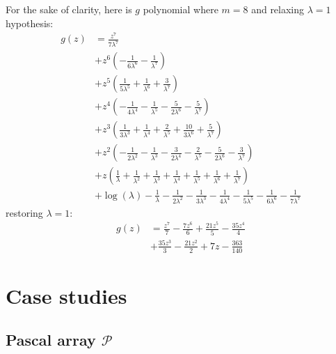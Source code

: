 For the sake of clarity, here is $g$ polynomial where $m=8$ and relaxing $\lambda=1$ hypothesis:
\begin{displaymath}
\begin{split}
g{\left (z \right )} &= \frac{z^{7}}{7 \lambda^{7}} \\
&+ z^{6} \left(- \frac{1}{6 \lambda^{6}} - \frac{1}{\lambda^{7}}\right) \\
&+ z^{5} \left(\frac{1}{5 \lambda^{5}} + \frac{1}{\lambda^{6}} + \frac{3}{\lambda^{7}}\right) \\
&+ z^{4} \left(- \frac{1}{4 \lambda^{4}} - \frac{1}{\lambda^{5}} - \frac{5}{2 \lambda^{6}} - \frac{5}{\lambda^{7}}\right) \\
&+ z^{3} \left(\frac{1}{3 \lambda^{3}} + \frac{1}{\lambda^{4}} + \frac{2}{\lambda^{5}} + \frac{10}{3 \lambda^{6}} + \frac{5}{\lambda^{7}}\right) \\
&+ z^{2} \left(- \frac{1}{2 \lambda^{2}} - \frac{1}{\lambda^{3}} - \frac{3}{2 \lambda^{4}} - \frac{2}{\lambda^{5}} - \frac{5}{2 \lambda^{6}} - \frac{3}{\lambda^{7}}\right) \\
&+ z \left(\frac{1}{\lambda} + \frac{1}{\lambda^{2}} + \frac{1}{\lambda^{3}} + \frac{1}{\lambda^{4}} + \frac{1}{\lambda^{5}} + \frac{1}{\lambda^{6}} + \frac{1}{\lambda^{7}}\right) \\
&+ \log{\left (\lambda \right )} - \frac{1}{\lambda} - \frac{1}{2 \lambda^{2}} - \frac{1}{3 \lambda^{3}} - \frac{1}{4 \lambda^{4}} - \frac{1}{5 \lambda^{5}} - \frac{1}{6 \lambda^{6}} - \frac{1}{7 \lambda^{7}}
\end{split}
\end{displaymath}
restoring $\lambda=1$:
\begin{displaymath}
\begin{split}
g{\left (z \right )} &= \frac{z^{7}}{7} - \frac{7 z^{6}}{6} + \frac{21 z^{5}}{5} - \frac{35 z^{4}}{4} \\
&+ \frac{35 z^{3}}{3} - \frac{21 z^{2}}{2} + 7 z - \frac{363}{140}
\end{split}
\end{displaymath}


\section{Case studies}

\subsection{Pascal array $\mathcal{P}$}

